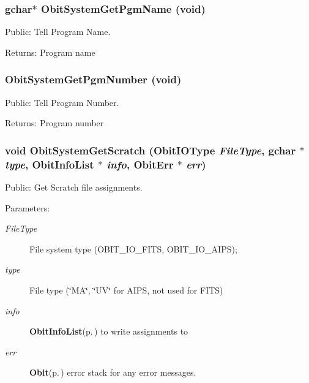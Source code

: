 \subsubsection{\setlength{\rightskip}{0pt plus 5cm}gchar$\ast$ Obit\-System\-Get\-Pgm\-Name (void)}\label{ObitSystem_8c_a21}


Public: Tell Program Name. 

\begin{Desc}
\item[Returns:]Program name \end{Desc}
\subsubsection{ Obit\-System\-Get\-Pgm\-Number (void)}\label{ObitSystem_8c_a23}


Public: Tell Program Number. 

\begin{Desc}
\item[Returns:]Program number \end{Desc}
\subsubsection{\setlength{\rightskip}{0pt plus 5cm}void Obit\-System\-Get\-Scratch (Obit\-IOType {\em File\-Type}, gchar $\ast$ {\em type}, {\bf Obit\-Info\-List} $\ast$ {\em info}, {\bf Obit\-Err} $\ast$ {\em err})}\label{ObitSystem_8c_a17}


Public: Get Scratch file assignments. 

\begin{Desc}
\item[Parameters:]
\begin{description}
\item[{\em File\-Type}]File system type (OBIT\_\-IO\_\-FITS, OBIT\_\-IO\_\-AIPS); \item[{\em type}]File type (\char`\"{}MA\char`\"{}, \char`\"{}UV\char`\"{} for AIPS, not used for FITS) \item[{\em info}]{\bf Obit\-Info\-List}{\rm (p.\,\pageref{structObitInfoList})} to write assignments to \item[{\em err}]{\bf Obit}{\rm (p.\,\pageref{structObit})} error stack for any error messages. \end{description}
\end{Desc}
